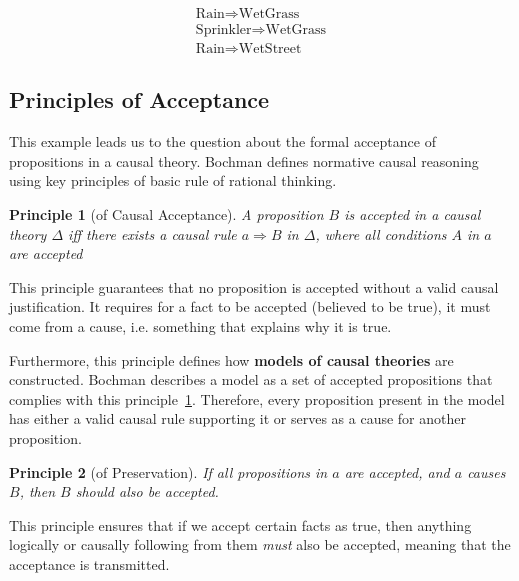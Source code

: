 \documentclass[seminar,palatino,english]{AIGpaper}
\begin{document}
\begin{equation}
    \begin{aligned}
        \text{Rain} \Rightarrow \text{WetGrass} \\
        \text{Sprinkler} \Rightarrow \text{WetGrass} \\
        \text{Rain} \Rightarrow \text{WetStreet}
    \end{aligned}
\end{equation}


\subsection{Principles of Acceptance}

This example leads us to the question about the formal acceptance of propositions in a causal theory. Bochman defines normative causal reasoning using key principles of basic rule of rational thinking. 

\newtheorem{principle}{Principle}
\begin{principle}[of Causal Acceptance]\label{principle:causal_acceptance}
A proposition $B$ is \emph{accepted} in a causal theory $ \Delta $ \emph{iff} there exists a causal rule $a \Rightarrow B$  in $ \Delta $, where all conditions $A$ in $a$ are accepted
\end{principle}

This principle guarantees that no proposition is accepted without a valid causal justification. It requires for a fact to be accepted (believed to be true), it must come from a cause, i.e. something that explains why it is true.

Furthermore, this principle defines how \textbf{models of causal theories} are constructed. Bochman describes a model as a set of accepted propositions that complies with this principle~\ref{principle:causal_acceptance}. Therefore, every proposition present in the model has either a valid causal rule supporting it or serves as a cause for another proposition. 

\begin{principle}[of Preservation]\label{principle:preservation}
If all propositions in $ a $ are accepted, and $ a $ causes $ B $, then $ B $ should also be accepted.
\end{principle}

This principle ensures that if we accept certain facts as true, then anything logically or causally following from them \emph{must} also be accepted, meaning that the acceptance is transmitted.
\end{document}
